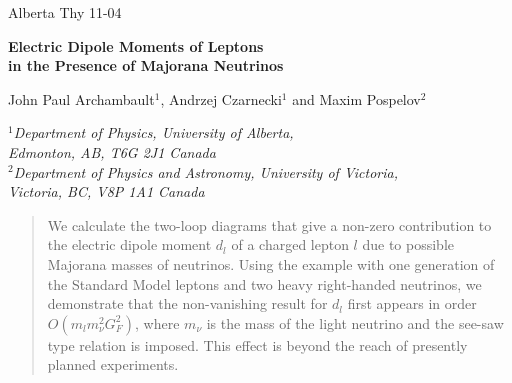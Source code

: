 \def\ga{\mathrel{\raise.3ex\hbox{$>$\kern-.75em\lower1ex\hbox{$\sim$}}}}
\def\la{\mathrel{\raise.3ex\hbox{$<$\kern-.75em\lower1ex\hbox{$\sim$}}}}
\def\ep{\epsilon}
\def\order#1{{\cal O}\left(#1\right)}
\def\ba{\begin{eqnarray}}
\def\ea{\end{eqnarray}}
\def\eq#1{(\ref{#1})}
\newcommand{\Wsla}{W\hspace{-0.7em}/}
\newcommand{\Psl}{\slash{\!\!\!\!P}}
\newcommand{\fr}[2]{\frac{#1}{#2}}


\pagestyle{plain}

\voffset -20mm \oddsidemargin 0in \textwidth 16cm \textheight 24cm
\parindent 0cm
\parskip 2mm





\hspace{\fill} Alberta Thy 11-04 

\begin{center}


\large {\bf Electric Dipole Moments of Leptons \\[2mm]
in the Presence of Majorana Neutrinos} \normalsize

\vspace{1cm}

John Paul Archambault$^1$,  Andrzej Czarnecki$^1$
 and
Maxim Pospelov$^2$



\vspace{1cm}


$^1${\it Department of Physics, University of Alberta, \\Edmonton,
AB, T6G 2J1 Canada}\\
$^2${\it Department of Physics and Astronomy, University of Victoria, \\
     Victoria, BC, V8P 1A1 Canada}

\end{center}


\begin{abstract}

We calculate the two-loop diagrams that give a non-zero
contribution to the electric dipole moment $d_l$ of a charged
lepton $l$ due to possible Majorana masses of neutrinos. Using the
example with one generation of the Standard Model leptons and two
heavy right-handed neutrinos, we demonstrate that the
non-vanishing result for $d_l$ first appears in order $O(m_l
m_\nu^2 G_F^2)$, where $m_\nu$ is the mass of the light neutrino
and the see-saw type relation is imposed. This effect is beyond
the reach of presently planned experiments.
\end{abstract}

